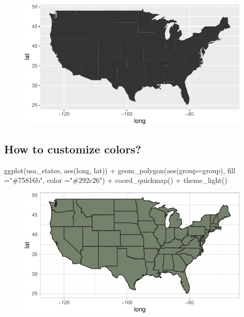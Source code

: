 \documentclass[
  letterpaper,
  DIV=11,
  numbers=noendperiod]{scrartcl}
\newenvironment{Shaded}{\begin{snugshade}}{\end{snugshade}}
\newcommand{\AttributeTok}[1]{\textcolor[rgb]{0.40,0.45,0.13}{#1}}
\newcommand{\FunctionTok}[1]{\textcolor[rgb]{0.28,0.35,0.67}{#1}}
\newcommand{\NormalTok}[1]{\textcolor[rgb]{0.00,0.23,0.31}{#1}}
\newcommand{\SpecialCharTok}[1]{\textcolor[rgb]{0.37,0.37,0.37}{#1}}
\newcommand{\StringTok}[1]{\textcolor[rgb]{0.13,0.47,0.30}{#1}}
\begin{document}
\begin{figure}[H]

{\centering \includegraphics{118_K_maps1_files/figure-pdf/unnamed-chunk-6-1.pdf}

}

\end{figure}

\hypertarget{how-to-customize-colors}{%
\subsection{How to customize colors?}\label{how-to-customize-colors}}

\begin{Shaded}
\begin{Highlighting}[]
\FunctionTok{ggplot}\NormalTok{(usa\_states, }\FunctionTok{aes}\NormalTok{(long, lat)) }\SpecialCharTok{+}
\FunctionTok{geom\_polygon}\NormalTok{(}\FunctionTok{aes}\NormalTok{(}\AttributeTok{group=}\NormalTok{group), }\AttributeTok{fill =}\StringTok{"\#75816b"}\NormalTok{, }\AttributeTok{color =}\StringTok{"\#292c26"}\NormalTok{) }\SpecialCharTok{+}
\FunctionTok{coord\_quickmap}\NormalTok{() }\SpecialCharTok{+}
\FunctionTok{theme\_light}\NormalTok{()}
\end{Highlighting}
\end{Shaded}

\begin{figure}[H]

{\centering \includegraphics{118_K_maps1_files/figure-pdf/unnamed-chunk-7-1.pdf}

}

\end{figure}
\end{document}
